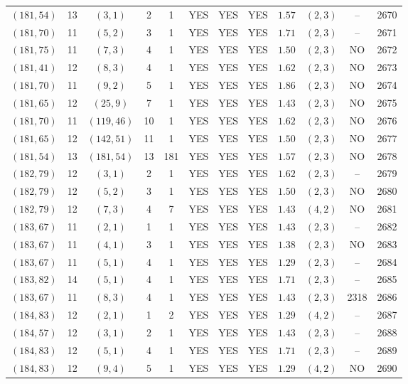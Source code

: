 \begin{longtable}{|c|c|c|c|c|c|c|c|c|c|c|c|}
$(181,54)$ & 13 & $(3,1)$ & 2 & 1 & YES & YES & YES & $1.57$ & $(2,3)$ & -- & 2670\\
$(181,70)$ & 11 & $(5,2)$ & 3 & 1 & YES & YES & YES & $1.71$ & $(2,3)$ & -- & 2671\\
$(181,75)$ & 11 & $(7,3)$ & 4 & 1 & YES & YES & YES & $1.50$ & $(2,3)$ & NO & 2672\\
$(181,41)$ & 12 & $(8,3)$ & 4 & 1 & YES & YES & YES & $1.62$ & $(2,3)$ & NO & 2673\\
$(181,70)$ & 11 & $(9,2)$ & 5 & 1 & YES & YES & YES & $1.86$ & $(2,3)$ & NO & 2674\\
$(181,65)$ & 12 & $(25,9)$ & 7 & 1 & YES & YES & YES & $1.43$ & $(2,3)$ & NO & 2675\\
$(181,70)$ & 11 & $(119,46)$ & 10 & 1 & YES & YES & YES & $1.62$ & $(2,3)$ & NO & 2676\\
$(181,65)$ & 12 & $(142,51)$ & 11 & 1 & YES & YES & YES & $1.50$ & $(2,3)$ & NO & 2677\\
$(181,54)$ & 13 & $(181,54)$ & 13 & 181 & YES & YES & YES & $1.57$ & $(2,3)$ & NO & 2678\\
$(182,79)$ & 12 & $(3,1)$ & 2 & 1 & YES & YES & YES & $1.62$ & $(2,3)$ & -- & 2679\\
$(182,79)$ & 12 & $(5,2)$ & 3 & 1 & YES & YES & YES & $1.50$ & $(2,3)$ & NO & 2680\\
$(182,79)$ & 12 & $(7,3)$ & 4 & 7 & YES & YES & YES & $1.43$ & $(4,2)$ & NO & 2681\\
$(183,67)$ & 11 & $(2,1)$ & 1 & 1 & YES & YES & YES & $1.43$ & $(2,3)$ & -- & 2682\\
$(183,67)$ & 11 & $(4,1)$ & 3 & 1 & YES & YES & YES & $1.38$ & $(2,3)$ & NO & 2683\\
$(183,67)$ & 11 & $(5,1)$ & 4 & 1 & YES & YES & YES & $1.29$ & $(2,3)$ & -- & 2684\\
$(183,82)$ & 14 & $(5,1)$ & 4 & 1 & YES & YES & YES & $1.71$ & $(2,3)$ & -- & 2685\\
$(183,67)$ & 11 & $(8,3)$ & 4 & 1 & YES & YES & YES & $1.43$ & $(2,3)$ & 2318 & 2686\\
$(184,83)$ & 12 & $(2,1)$ & 1 & 2 & YES & YES & YES & $1.29$ & $(4,2)$ & -- & 2687\\
$(184,57)$ & 12 & $(3,1)$ & 2 & 1 & YES & YES & YES & $1.43$ & $(2,3)$ & -- & 2688\\
$(184,83)$ & 12 & $(5,1)$ & 4 & 1 & YES & YES & YES & $1.71$ & $(2,3)$ & -- & 2689\\
$(184,83)$ & 12 & $(9,4)$ & 5 & 1 & YES & YES & YES & $1.29$ & $(4,2)$ & NO & 2690\\

\end{longtable}
